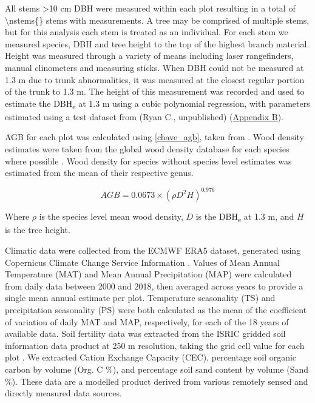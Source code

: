 \documentclass[11pt,a4paper]{article}
\begin{document}
All stems >10 cm DBH were measured within each plot resulting in a total of \num[group-separator={,}]{\nstems{}} stems with measurements. A tree may be comprised of multiple stems, but for this analysis each stem is treated as an individual. For each stem we measured species, DBH and tree height to the top of the highest branch material. Height was measured through a variety of means including laser rangefinders, manual clinometers and measuring sticks. When DBH could not be measured at 1.3 m due to trunk abnormalities, it was measured at the closest regular portion of the trunk to 1.3 m. The height of this measurement was recorded and used to estimate the DBH\textsubscript{e} at 1.3 m using a cubic polynomial regression, with parameters estimated using a test dataset from (Ryan C., unpublished) (\hyperref[appendixb]{Appendix B}).

AGB for each plot was calculated using \autoref{chave_agb}, taken from \citet{Chave2014}. Wood density estimates were taken from the global wood density database for each species where possible \citep{Chave2009, Zanne2009}. Wood density for species without species level estimates was estimated from the mean of their respective genus. 

\begin{equation}
	AGB = 0.0673 \times (\rho D^{2} H)^{0.976}
	\label{chave_agb}
\end{equation}

Where $\rho$ is the species level mean wood density, $D$ is the DBH\textsubscript{e} at 1.3 m, and $H$ is the tree height.

Climatic data were collected from the ECMWF ERA5 dataset, generated using Copernicus Climate Change Service Information \citep{ERA5}. Values of Mean Annual Temperature (MAT) and Mean Annual Precipitation (MAP) were calculated from daily data between 2000 and 2018, then averaged across years to provide a single mean annual estimate per plot. Temperature seasonality (TS) and precipitation seasonality (PS) were both calculated as the mean of the coefficient of variation of daily MAT and MAP, respectively, for each of the 18 years of available data. Soil fertility data was extracted from the ISRIC gridded soil information data product at 250 m resolution, taking the grid cell value for each plot \citep{Hengl2017}. We extracted Cation Exchange Capacity (CEC), percentage soil organic carbon by volume (Org. C \%), and percentage soil sand content by volume (Sand \%). These data are a modelled product derived from various remotely sensed and directly measured data sources. 
\end{document}
